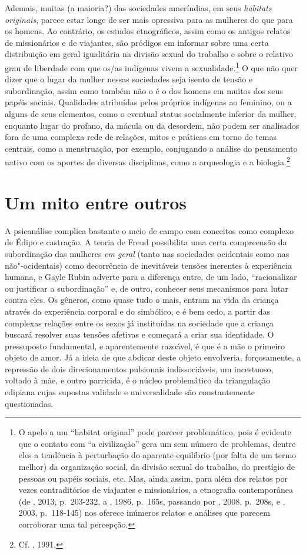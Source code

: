 Ademais, muitas (a maioria?) das sociedades ameríndias, em seus
\emph{habitats originais}, parece estar longe de ser mais opressiva para
as mulheres do que para os homens. Ao contrário, os estudos
etnográficos, assim como os antigos relatos de missionários e de
viajantes, são pródigos em informar sobre uma certa distribuição em
geral igualitária na divisão sexual do trabalho e sobre o relativo grau
de liberdade com que os/as indígenas vivem a sexualidade.\footnote{O apelo
  a um ``habitat original'' pode parecer problemático, pois é evidente
  que o contato com ``a civilização'' gera um sem número de problemas,
  dentre eles a tendência à perturbação do aparente equilíbrio (por
  falta de um termo melhor) da organização social, da divisão sexual do
  trabalho, do prestígio de pessoas ou papéis sociais, etc. Mas, ainda
  assim, para além dos relatos por vezes contraditórios de viajantes e
  missionários, a etnografia contemporânea (de , 2013,
  p.~203-232, a , 1986, p.~165s, passando por
  , 2008, p.~208s, e , 2003, p.~118-145) nos oferece
  inúmeros relatos e análises que parecem corroborar uma tal percepção.}
O que não quer dizer que o lugar da mulher nessas sociedades seja isento
de tensão e subordinação, assim como também não o é o dos homens em
muitos dos seus papéis sociais. Qualidades atribuídas pelos próprios
indígenas ao feminino, ou a alguns de seus elementos, como o eventual
status socialmente inferior da mulher, enquanto lugar do profano, da
mácula ou da desordem, não podem ser analisados fora de uma complexa
rede de relações, mitos e práticas em torno de temas centrais, como a
menstruação, por exemplo, conjugando a análise do pensamento nativo com
os aportes de diversas disciplinas, como a arqueologia e a
biologia.\footnote{Cf. , 1991.}

\section{Um mito entre outros}

A psicanálise complica bastante o meio de campo com conceitos como
complexo de Édipo e castração. A teoria de Freud possibilita uma certa
compreensão da subordinação das mulheres \emph{em geral} (tanto nas
sociedades ocidentais como nas não"-ocidentais) como decorrência de
inevitáveis tensões inerentes à experiência humana, e Gayle Rubin
adverte para a diferença entre, de um lado, ``racionalizar ou justificar
a subordinação'' e, de outro, conhecer seus mecanismos para lutar contra
eles. Os gêneros, como quase tudo o mais, entram na vida da criança
através da experiência corporal e do simbólico, e é bem cedo, a partir
das complexas relações entre os sexos já instituídas na sociedade que a
criança buscará resolver suas tensões afetivas e começará a criar sua
identidade. O pressuposto fundamental, e aparentemente razoável, é que é
a mãe o primeiro objeto de amor. Já a ideia de que abdicar deste objeto
envolveria, forçosamente, a repressão de dois direcionamentos pulsionais
indissociáveis, um incestuoso, voltado à mãe, e outro parricida, é o
núcleo problemático da triangulação edipiana cujas supostas validade e
universalidade são constantemente questionadas.

